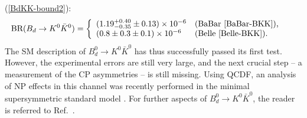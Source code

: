 \documentclass[12pt]{article}
\begin{document}
(\ref{BdKK-bound2}):
\begin{equation}\label{BdK0K0-data}
\hspace*{-0.5truecm}
\mbox{BR}(B_d\to K^0\bar K^0)=\left\{
\begin{array}{ll}
(1.19^{+0.40}_{-0.35}\pm0.13) \times 10^{-6} & \mbox{(BaBar 
\cite{BaBar-BKK}),}\\
 (0.8\pm0.3\pm0.1) \times 10^{-6} & \mbox{(Belle \cite{Belle-BKK}).}
 \end{array}\right.
\end{equation}
The SM description of $B^0_d\to K^0\bar K^0$ has thus successfully passed its 
first test. However, the experimental errors are still very large, and the next crucial 
step -- a measurement of the CP asymmetries -- is still missing. Using QCDF, 
an analysis of NP effects in this channel was recently performed in the minimal 
supersymmetric standard model \cite{giri-moh}. For further aspects of 
$B^0_d\to K^0\bar K^0$, the reader is referred to Ref.~\cite{FR1}.

%
%
%
\boldmath
\end{document}
